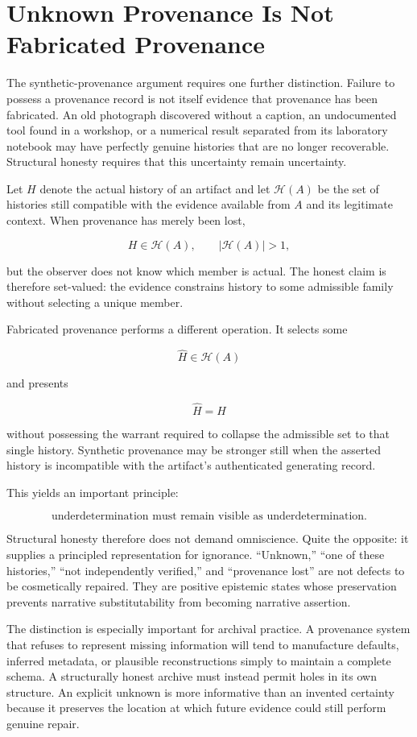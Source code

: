 \documentclass[11pt]{article}
\begin{document}
\section{Unknown Provenance Is Not Fabricated Provenance}
\label{sec:unknown-provenance}

The synthetic-provenance argument requires one further distinction. Failure to possess a provenance record is not itself evidence that provenance has been fabricated. An old photograph discovered without a caption, an undocumented tool found in a workshop, or a numerical result separated from its laboratory notebook may have perfectly genuine histories that are no longer recoverable. Structural honesty requires that this uncertainty remain uncertainty.

Let $H$ denote the actual history of an artifact and let $\mathcal{H}(A)$ be the set of histories still compatible with the evidence available from $A$ and its legitimate context. When provenance has merely been lost,

\[
H \in \mathcal{H}(A),
\qquad
|\mathcal{H}(A)| > 1,
\]

but the observer does not know which member is actual. The honest claim is therefore set-valued: the evidence constrains history to some admissible family without selecting a unique member.

Fabricated provenance performs a different operation. It selects some

\[
\widehat H \in \mathcal{H}(A)
\]

and presents

\[
\widehat H = H
\]

without possessing the warrant required to collapse the admissible set to that single history. Synthetic provenance may be stronger still when the asserted history is incompatible with the artifact's authenticated generating record.

This yields an important principle:

\[
\boxed{
\text{underdetermination must remain visible as underdetermination.}
}
\]

Structural honesty therefore does not demand omniscience. Quite the opposite: it supplies a principled representation for ignorance. ``Unknown,'' ``one of these histories,'' ``not independently verified,'' and ``provenance lost'' are not defects to be cosmetically repaired. They are positive epistemic states whose preservation prevents narrative substitutability from becoming narrative assertion.

The distinction is especially important for archival practice. A provenance system that refuses to represent missing information will tend to manufacture defaults, inferred metadata, or plausible reconstructions simply to maintain a complete schema. A structurally honest archive must instead permit holes in its own structure. An explicit unknown is more informative than an invented certainty because it preserves the location at which future evidence could still perform genuine repair.
\end{document}
